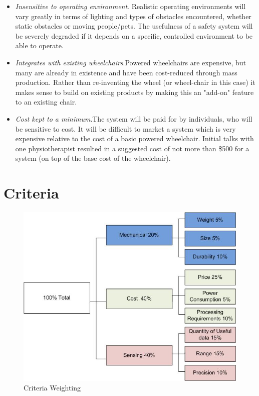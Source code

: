\documentclass[oneside,final,a4paper]{report}
\begin{document}
\begin{itemize}
 \item \emph{Insensitive to operating environment}.  Realistic operating environments will vary greatly in terms of lighting and types of obstacles encountered, whether static obstacles or moving people/pets. The usefulness of a safety system will be severely degraded if it depends on a specific, controlled environment to be able to operate.
 \item \emph{Integrates with existing wheelchairs}.Powered wheelchairs are expensive, but many are already in existence and have been cost-reduced through mass production. Rather than re-inventing the wheel (or wheel-chair in this case) it makes sense to build on existing products by making this an "add-on" feature to an existing chair.

 \item \emph{Cost kept to a minimum}.The system will be paid for by individuals, who will be sensitive to cost. It will be difficult to market a system which is very expensive relative to the cost of a basic powered wheelchair. Initial talks with one physiotherapist resulted in a suggested cost of not more than \$500 for a system (on top of the base cost of the wheelchair).
\end{itemize}

\section{Criteria}
\begin{figure}[hbt]
 \centering
 \includegraphics[scale=0.5]{CriteriaWeighting}
 \caption{Criteria Weighting} \label{fig:criteria_weighting}
\end{figure}
\end{document}
